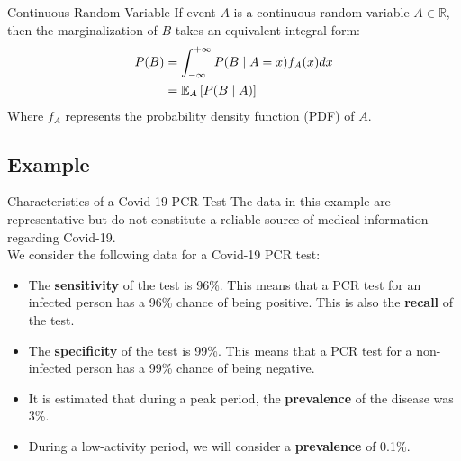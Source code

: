 \begin{frame}{Continuous Random Variable}
	If event $A$ is a continuous random variable $A \in \mathbb{R}$, then the marginalization of $B$ takes an equivalent integral form:
	\begin{equation}
		\begin{aligned}
			P(B) &= \int_{-\infty}^{+\infty} P(B \mid A=x) f_A(x) dx \\
			&= \E[A]{P(B \mid A)}
		\end{aligned}
		\nonumber
	\end{equation}
	Where $f_A$ represents the probability density function (PDF) of $A$.
\end{frame}

\subsection{Example}

\begin{frame}{Characteristics of a Covid-19 PCR Test}
	\faExclamationTriangle The data in this example are representative but do not constitute a reliable source of medical information regarding Covid-19. \\
	\vspace{0.5cm}
	\pause
	We consider the following data for a Covid-19 PCR test:
	\begin{itemize}
		\item The \textbf{sensitivity} of the test is 96\%. This means that a PCR test for an infected person has a 96\% chance of being positive. This is also the \textbf{recall} of the test.
		\pause
		\item The \textbf{specificity} of the test is 99\%. This means that a PCR test for a non-infected person has a 99\% chance of being negative.
		\pause
		\item It is estimated that during a peak period, the \textbf{prevalence} of the disease was 3\%.
		\pause
		\item During a low-activity period, we will consider a \textbf{prevalence} of 0.1\%.
	\end{itemize}
\end{frame}

